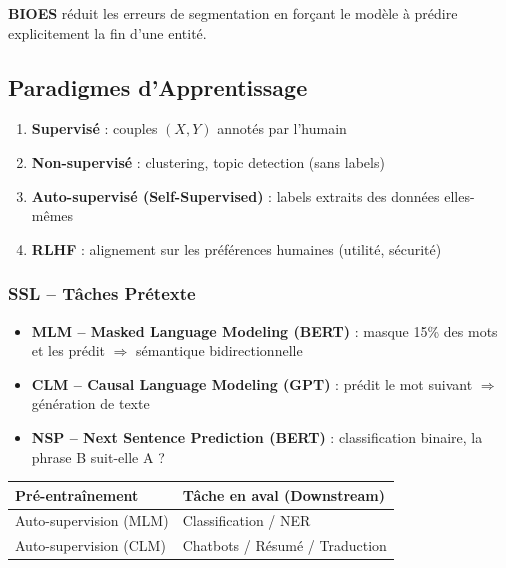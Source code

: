 \documentclass[a4paper,10pt]{article}
\begin{document}
\textbf{BIOES} réduit les erreurs de segmentation en forçant le modèle à prédire explicitement la fin d'une entité.

\subsection{Paradigmes d'Apprentissage}

\begin{definitionbox}
\begin{enumerate}
  \item \textbf{Supervisé} : couples $(X, Y)$ annotés par l'humain
  \item \textbf{Non-supervisé} : clustering, topic detection (sans labels)
  \item \textbf{Auto-supervisé (Self-Supervised)} : labels extraits des données elles-mêmes
  \item \textbf{RLHF} : alignement sur les préférences humaines (utilité, sécurité)
\end{enumerate}
\end{definitionbox}

\subsubsection{SSL -- Tâches Prétexte}
\begin{itemize}
  \item \textbf{MLM -- Masked Language Modeling (BERT)} : masque 15\% des mots et les prédit $\Rightarrow$ sémantique bidirectionnelle
  \item \textbf{CLM -- Causal Language Modeling (GPT)} : prédit le mot suivant $\Rightarrow$ génération de texte
  \item \textbf{NSP -- Next Sentence Prediction (BERT)} : classification binaire, la phrase B suit-elle A ?
\end{itemize}

\begin{center}
\begin{tabular}{ll}
\toprule
\textbf{Pré-entraînement} & \textbf{Tâche en aval (Downstream)} \\
\midrule
Auto-supervision (MLM) & Classification / NER \\
Auto-supervision (CLM) & Chatbots / Résumé / Traduction \\
\bottomrule
\end{tabular}
\end{center}
\end{document}
